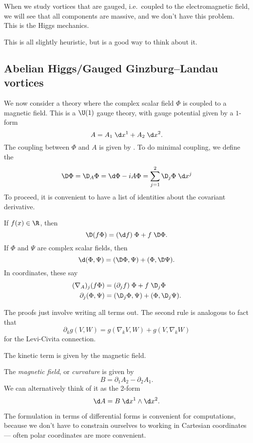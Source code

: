 \documentclass[a4paper]{article}
\begin{document}
When we study vortices that are gauged, i.e.\ coupled to the electromagnetic field, we will see that all components are massive, and we don't have this problem. This is the Higgs mechanics.

This is all slightly heuristic, but is a good way to think about it.

\subsection{Abelian Higgs/Gauged Ginzburg--Landau vortices}
We now consider a theory where the complex scalar field $\Phi$ is coupled to a magnetic field. This is a $\U(1)$ gauge theory, with gauge potential given by a $1$-form
\[
  A = A_1 \;\d x^1 + A_2 \;\d x^2.
\]
The coupling between $\Phi$ and $A$ is given by . To do minimal coupling, we define the \index{$\D$}
\[
  \D \Phi = \D_A \Phi = \d \Phi - i A \Phi = \sum_{j = 1}^2 \D_j \Phi \;\d x^j
\]
To proceed, it is convenient to have a list of identities about the covariant derivative.
\begin{prop}
  If $f(x) \in \R$, then
  \[
    \D (f \Phi) = (\d f) \; \Phi + f\;\D \Phi.
  \]
  If $\Phi$ and $\Psi$ are complex scalar fields, then
  \[
    \d (\Phi, \Psi) = (\D \Phi, \Psi) + (\Phi, \D \Psi).
  \]
  In coordinates, these say
  \begin{align*}
    (\nabla_A)_j (f \Phi) &= (\partial_j f)\;\Phi + f\; \D_j \Phi\\
    \partial_j (\Phi, \Psi) &= (\D_j \Phi, \Psi) + (\Phi, \D_j \Psi).
  \end{align*}
\end{prop}
The proofs just involve writing all terms out. The second rule is analogous to fact that
\[
  \partial_k g(V, W) = g(\nabla_k V, W) + g(V, \nabla_k W)
\]
for the Levi-Civita connection.

The kinetic term is given by the magnetic field.
\begin{defi}
  The \emph{magnetic field}, or \emph{curvature} is given by
  \[
    B = \partial_1 A_2 - \partial_2 A_1.
  \]
  We can alternatively think of it as the 2-form
  \[
    \d A = B \;\d x^1 \wedge\d x^2.
  \]
\end{defi}
The formulation in terms of differential forms is convenient for computations, because we don't have to constrain ourselves to working in Cartesian coordinates --- often polar coordinates are more convenient.
\end{document}
